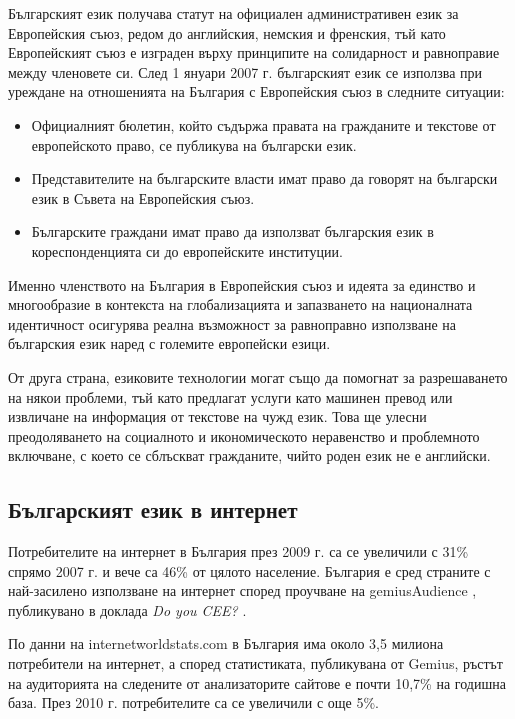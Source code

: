 \documentclass[]{../../metanetpaper}
\begin{document}
\begin{multicols}{2}
Българският език получава статут на официален административен език за Европейския съюз, редом до английския, немския и френския, тъй като Европейският съюз е изграден върху принципите на солидарност и равноправие между членовете си. След 1 януари 2007 г. българският език се използва при уреждане на отношенията на България с Европейския съюз в следните ситуации:
 
\begin{itemize}
\item Официалният бюлетин, който съдържа правата на гражданите и текстове от европейското право, се публикува на български език. 
\item Представителите на българските власти имат право да говорят на български език в Съвета на Европейския съюз. 
\item Българските граждани имат право да използват българския език в кореспонденцията си до европейските институции.
\end{itemize}

Именно членството на България в Европейския съюз и идеята за единство и многообразие в контекста на глобализацията и запазването на националната идентичност осигурява реална възможност за равноправно използване на българския език наред с големите европейски езици. 

От друга страна, езиковите технологии могат също да помогнат за разрешаването на някои проблеми, тъй като предлагат услуги като машинен превод или извличане на информация от текстове на чужд език. Това ще улесни преодоляването на социалното и икономическото неравенство и проблемното включване, с което се сблъскват гражданите, чийто роден език не е английски.


\subsection{Българският език в интернет}

Потребителите на интернет в България през 2009 г. са се увеличили с 31\% спрямо 2007 г. и вече са 46\% от цялото население. България е сред страните с най-засилено използване на интернет според проучване на gemiusAudience \cite{gemius}, публикувано в доклада \textit{Do you CEE?} \cite{inetcee}.
 
По данни на internetworldstats.com \cite{inetworldstat} в България има около 3,5 милиона потребители на интернет, а според статистиката, публикувана от Gemius, ръстът на аудиторията на следените от анализаторите сайтове е почти 10,7\% на годишна база. През 2010 г. потребителите са се увеличили с още 5\%. 


\end{multicols}
\end{document}
